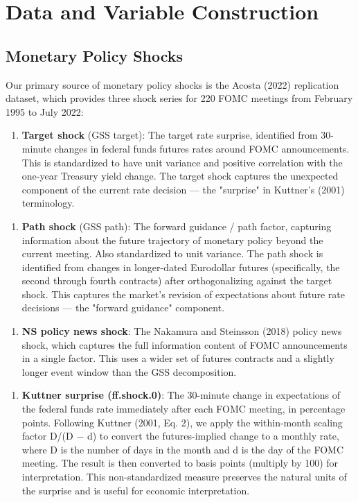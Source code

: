 \section{Data and Variable Construction}

\subsection{Monetary Policy Shocks}

Our primary source of monetary policy shocks is the Acosta (2022) replication dataset, which provides three shock series for 220 FOMC meetings from February 1995 to July 2022:

\begin{enumerate}
\item \textbf{Target shock} (GSS target): The target rate surprise, identified from 30-minute changes in federal funds futures rates around FOMC announcements. This is standardized to have unit variance and positive correlation with the one-year Treasury yield change. The target shock captures the unexpected component of the current rate decision --- the "surprise" in Kuttner's (2001) terminology.
\end{enumerate}

\begin{enumerate}
\item \textbf{Path shock} (GSS path): The forward guidance / path factor, capturing information about the future trajectory of monetary policy beyond the current meeting. Also standardized to unit variance. The path shock is identified from changes in longer-dated Eurodollar futures (specifically, the second through fourth contracts) after orthogonalizing against the target shock. This captures the market's revision of expectations about future rate decisions --- the "forward guidance" component.
\end{enumerate}

\begin{enumerate}
\item \textbf{NS policy news shock}: The Nakamura and Steinsson (2018) policy news shock, which captures the full information content of FOMC announcements in a single factor. This uses a wider set of futures contracts and a slightly longer event window than the GSS decomposition.
\end{enumerate}

\begin{enumerate}
\item \textbf{Kuttner surprise (ff.shock.0)}: The 30-minute change in expectations of the federal funds rate immediately after each FOMC meeting, in percentage points. Following Kuttner (2001, Eq. 2), we apply the within-month scaling factor D/(D $-$ d) to convert the futures-implied change to a monthly rate, where D is the number of days in the month and d is the day of the FOMC meeting. The result is then converted to basis points (multiply by 100) for interpretation. This non-standardized measure preserves the natural units of the surprise and is useful for economic interpretation.
\end{enumerate}

